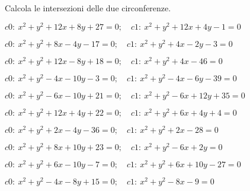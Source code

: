 \newpage
\begin{esercizio}\label{ese:}
 Calcola le intersezioni delle due circonferenze.
 \begin{enumeratea}
  \item  \(c0:~x^2 + y^2 +12x +8y +27 = 0; \quad c1:~x^2 + y^2 +12x +4y -1 = 
0\)\\
   \makebox[\linewidth][r]
   {[\(ar:~y = -7;~A \punto{-10}{-7};~B \punto{-2}{-7}\)]}
  \item  \(c0:~x^2 + y^2 +8x -4y -17 = 0; \quad c1:~x^2 + y^2 +4x -2y -3 = 
0\)\\
   \makebox[\linewidth][r]
   {[\(ar:~y = 2x -7;~\emptyset\)]}
  \item  \(c0:~x^2 + y^2 +12x -8y +18 = 0; \quad c1:~x^2 + y^2 +4x -46 = 
0\)\\
   \makebox[\linewidth][r]
   {[\(ar:~y = x +8;~A \punto{-1}{7};~B \punto{-9}{-1}\)]}
  \item  \(c0:~x^2 + y^2 -4x -10y -3 = 0; \quad c1:~x^2 + y^2 -4x -6y -39 = 
0\)\\
   \makebox[\linewidth][r]
   {[\(ar:~y = 9;~A \punto{6}{9};~B \punto{-2}{9}\)]}
  \item  \(c0:~x^2 + y^2 -6x -10y +21 = 0; \quad c1:~x^2 + y^2 -6x +12y +35 
= 0\)\\
   \makebox[\linewidth][r]
   {[\(ar:~y = -\frac{7}{11};~\emptyset\)]}
  \item  \(c0:~x^2 + y^2 +12x +4y +22 = 0; \quad c1:~x^2 + y^2 +6x +4y +4 = 
0\)\\
   \makebox[\linewidth][r]
   {[\(ar:~x = -3;~A \punto{-3}{1};~B \punto{-3}{1}\)]}
  \item  \(c0:~x^2 + y^2 +2x -4y -36 = 0; \quad c1:~x^2 + y^2 +2x -28 = 
0\)\\
   \makebox[\linewidth][r]
   {[\(ar:~y = -2;~A \punto{-6}{-2};~B \punto{4}{-2}\)]}
  \item  \(c0:~x^2 + y^2 +8x +10y +23 = 0; \quad c1:~x^2 + y^2 -6x +2y  = 
0\)\\
   \makebox[\linewidth][r]
   {[\(ar:y = -\frac{7}{4}x -\frac{23}{8};~\emptyset\)]}
  \item  \(c0:~x^2 + y^2 +6x -10y -7 = 0; \quad c1:~x^2 + y^2 +6x +10y -27 = 
0\)\\
   \makebox[\linewidth][r]
   {[\(ar:~y = 1;~A \punto{-8}{1};~B \punto{2}{1}\)]}
  \item  \(c0:~x^2 + y^2 -4x -8y +15 = 0; \quad c1:~x^2 + y^2 -8x -9 = 0\)\\
   \makebox[\linewidth][r]
   {[\(ar:~y = \frac{1}{2} x +3;~A \punto{0}{3};~B \punto{4}{5}\)]}
 \end{enumeratea}
\end{esercizio}


